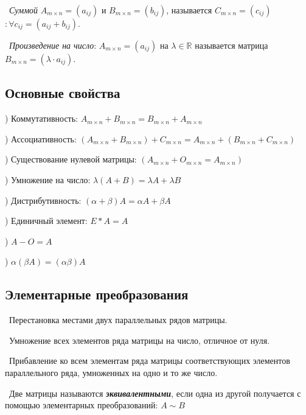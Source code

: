\smallskip
\noindent \textasteriskcentered~\textit{Суммой} $A_{m \times n} = (a_{ij})$ и $B_{m \times n} = (b_{ij})$, называется $C_{m \times n} = (c_{ij})$ $: \forall c_{ij} = (a_{ij} + b_{ij})$.

\smallskip 
\noindent \textasteriskcentered~\textit{Произведение на число}: $A_{m \times n} = (a_{ij})$ на $\lambda \in \mathbb{R}$ называется матрица $B_{m \times n} = (\lambda \cdot a_{ij})$.


\subsection*{Основные свойства}

) Коммутативность: 
$A_{m \times n} + B_{m \times n} = B_{m \times n} + A_{m \times n}$

\smallskip 
{}) Ассоциативность:
$(A_{m \times n} + B_{m \times n}) + C_{m \times n} = A_{m \times n} + (B_{m \times n} 
+ C_{m \times n})$

\smallskip 
{}) Существование нулевой матрицы:
$(A_{m \times n} + O_{m \times n} = A_{m \times n})$

\smallskip 
{}) Умножение на число:
$\lambda (A + B) = \lambda A + \lambda B$

\smallskip 
{}) Дистрибутивность: 
$(\alpha + \beta) A = \alpha A + \beta A$

\smallskip 
{}) Единичный элемент:
$E * A = A$

\smallskip 
{}) $A - O = A$

\smallskip 
{}) $\alpha (\beta A) = (\alpha \beta) A$


\subsection*{Элементарные преобразования}

\noindent \textbullet~Перестановка местами двух параллельных рядов матрицы.

\noindent \textbullet~Умножение всех элементов ряда матрицы на число, отличное от нуля.

\noindent \textbullet~Прибавление ко всем элементам ряда матрицы соответствующих элементов параллельного ряда, умноженных на одно и то же число.

\smallskip
\noindent \textasteriskcentered~Две матрицы называются \textbf{\textit{эквивалентными}}, если одна из другой
получается с помощью элементарных преобразований: $A \sim B$


